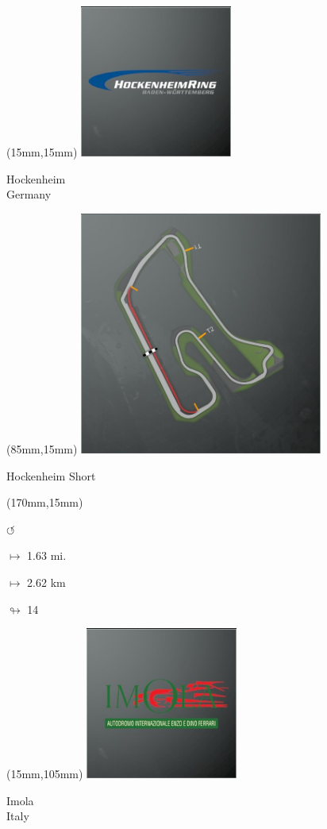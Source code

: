 \begin{textblock*}{60mm}(15mm,15mm)%
\includegraphics[width=50mm]{LG/2015-05-20_00082.png}
\par Hockenheim\\ Germany
\end{textblock*}
\begin{textblock*}{80mm}(85mm,15mm)%
\includegraphics[width=80mm]{TR/2015-05-20_00029.png}
\centerline{Hockenheim Short}
\end{textblock*}
\begin{textblock*}{30mm}(170mm,15mm)%
\par \Huge$\circlearrowleft$
\Large
\par$\mapsto$ 1.63 mi.
\par$\mapsto$ 2.62 km
\par$\looparrowright$ 14
\end{textblock*}
\begin{textblock*}{60mm}(15mm,105mm)%
\includegraphics[width=50mm]{LG/2015-05-20_00083.png}
\par Imola\\ Italy
\end{textblock*}
